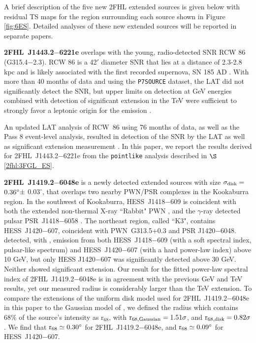 A brief description of the five new 2FHL extended sources is given below with residual TS maps for the region surrounding each source shown in Figure \ref{fig:6ES}. Detailed analyses of these new extended sources will be reported in separate papers.


{\bfseries 2FHL~J1443.2$-$6221e} overlaps with the young, radio-detected SNR RCW 86 (G315.4−2.3). RCW 86 is a 42$'$ diameter SNR that lies at a distance of 2.3-2.8 kpc and is likely associated with the first recorded supernova, SN 185 AD \citep{Rosado96,Sollerman03}. With more than 40 months of data and using the {\tt P7SOURCE} dataset, the LAT did not significantly detect the SNR, but upper limits on detection at GeV energies combined with detection of significant extension in the TeV \citep{Aharonian09} were sufficient to strongly favor a leptonic origin for the emission \citep{Lemoine-Goumard12}.

An updated LAT analysis of RCW~86 using 76 months of data, as well as the Pass 8 event-level analysis, resulted in detection of the SNR by the LAT as well as significant extension measurement \citep[the former published after \cite{2FHL}]{Ajello_rcw86,Hewitt15a}. In this paper, we report the results derived for 2FHL~J1443.2$-$6221e from the {\tt pointlike} analysis described in $\S$ \ref{2fhl:3FGL_ES}.

{\bfseries 2FHL~J1419.2$-$6048e} is a newly detected extended sources with size
 ${\rm \sigma_{disk} =}$ ${\rm 0.36 ^{\circ} \pm}$ $0.03 ^{\circ}$, that overlaps two nearby PWN/PSR complexes in the Kookaburra region. In the southwest of Kookaburra, HESS~J1418$-$609 \citep{AharonianKook06} is coincident with both the extended non-thermal X-ray ``Rabbit" PWN \citep[G313.3+0.1,][]{Roberts99}, and the $\gamma$-ray detected pulsar PSR~J1418$-$6058 \citep{AbdoBlindPSR09}. The northeast region, called ``K3", contains HESS~J1420$-$607, coincident with PWN~G313.5+0.3 and PSR J1420$-$6048. \cite{Acero13} detected, with \lat, emission from both HESS~J1418$-$609 (with a soft spectral index, pulsar-like spectrum) and HESS~J1420$-$607 (with a hard power-law index) above 10 GeV, but only HESS J1420$-$607 was significantly detected above 30 GeV. Neither showed significant extension. Our result for the fitted power-law spectral index of 2FHL~J1419.2$-$6048e is in agreement with the previous GeV and TeV results, yet our measured radius is considerably larger than the TeV extension. To compare the extensions of the uniform disk model used for 2FHL~J1419.2$-$6048e in this paper to the Gaussian model of \cite{AharonianKook06}, we defined the radius which contains 68\% of the source's intensity as r$_{68}$, with ${\rm r_{68,Gaussian} = 1.51\sigma}$, and ${\rm r_{68,disk} = 0.82\sigma}$  \citep{Lande12}. We find that ${\rm r_{68} \simeq 0.30^{\circ}}$ for 2FHL~J1419.2$-$6048e, and ${\rm r_{68}} \simeq 0.09^{\circ}$ for HESS~J1420$-$607. 

